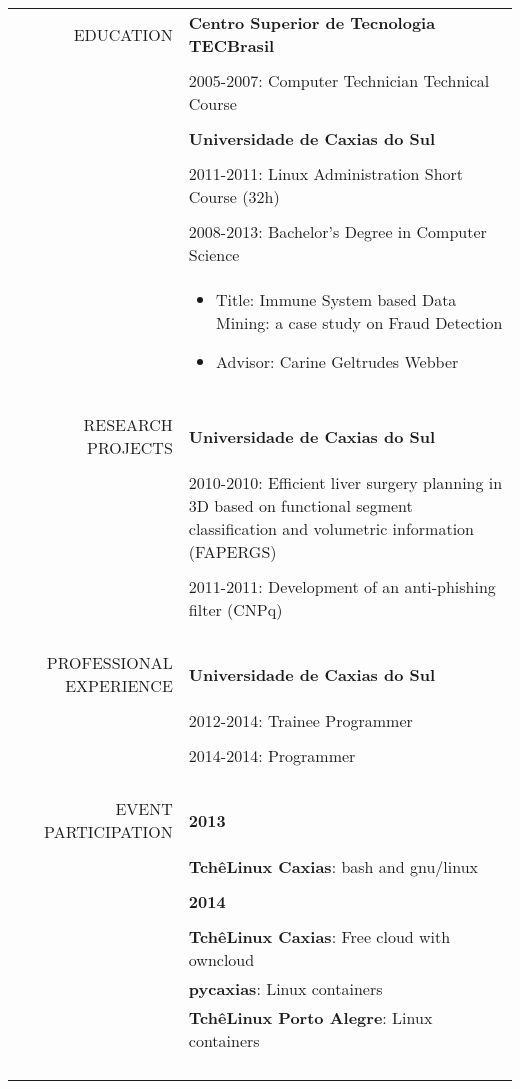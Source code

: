 \begin{tabular}{rp{13cm}}
    EDUCATION
    & \bf Centro Superior de Tecnologia TECBrasil \\\\
    & 2005-2007: Computer Technician Technical Course \\\\
    & \bf Universidade de Caxias do Sul \\\\
    & 2011-2011: Linux Administration Short Course (32h) \\\\
    & 2008-2013: Bachelor's Degree in Computer Science \\
    & \begin{itemize}
        \vspace{-5mm}
        \itemsep-1mm
        \item Title:
            Immune System based Data Mining: a case study on Fraud
            Detection
        \item Advisor: Carine Geltrudes Webber
    \end{itemize} \\\\
    \hline \\\\
    RESEARCH PROJECTS
    & \bf Universidade de Caxias do Sul \\\\
    & 2010-2010:
        Efficient liver surgery planning in 3D based on functional segment
        classification and volumetric information (FAPERGS) \\\\
    & 2011-2011: Development of an anti-phishing filter (CNPq) \\\\\\
    \hline \\\\
    PROFESSIONAL EXPERIENCE
    & \bf Universidade de Caxias do Sul \\\\
    & 2012-2014: Trainee Programmer \\\\
    & 2014-2014: Programmer \\\\\\
    \hline \\\\
    EVENT PARTICIPATION
    & \bf 2013 \\\\
    & \textbf{TchêLinux Caxias}: bash and gnu/linux \\\\
    & \bf 2014 \\\\
    & \textbf{TchêLinux Caxias}: Free cloud with owncloud \\
    & \textbf{pycaxias}: Linux containers \\
    & \textbf{TchêLinux Porto Alegre}: Linux containers \\\\\\
    \hline \\\\
\end{tabular}
